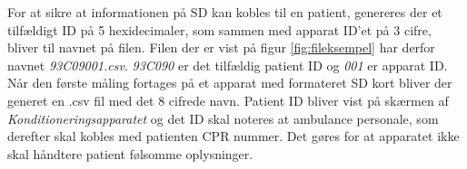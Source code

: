 For at sikre at informationen på SD kan kobles til en patient, genereres der et tilfældigt ID på 5 hexidecimaler, som sammen med apparat ID'et på 3 cifre, bliver til navnet på filen. Filen der er vist på figur \ref{fig:fileksempel} har derfor navnet \textit{93C09001.csv}. \textit{93C090} er det tilfældig patient ID og \textit{001} er apparat ID. Når den første måling fortages på et apparat med formateret SD kort bliver der generet en .csv fil med det 8 cifrede navn. Patient ID bliver vist på skærmen af \textit{Konditioneringsapparatet} og det ID skal noteres at ambulance personale, som derefter skal kobles med patienten CPR nummer. Det gøres for at apparatet ikke skal håndtere patient følsomme oplysninger.
